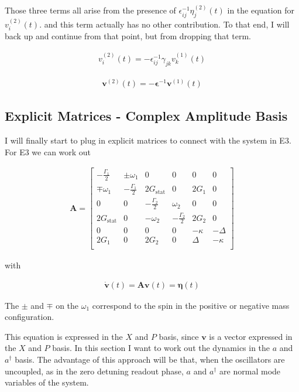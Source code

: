 \documentclass[12pt]{article}
\newcommand{\bv}[1]{\boldsymbol{#1}}
\begin{document}
Those three terms all arise from the presence of $\epsilon^{-1}_{ij}\eta^{(2)}_{j}(t)$ in the equation for $v^{(2)}_{i}(t)$. and this term actually has no other contribution. To that end, I will back up and continue from that point, but from dropping that term.

\begin{align}
v^{(2)}_{i}(t) = -\epsilon^{-1}_{ij}\gamma_{jk}v^{(1)}_{k}(t)
\end{align}

\begin{align}
\bv{v}^{(2)}(t) = -\bv{\epsilon}^{-1}\bv{v}^{(1)}(t)
\end{align}

\subsection{Explicit Matrices - Complex Amplitude Basis}

I will finally start to plug in explicit matrices to connect with the system in E3. For E3 we can work out

\begin{align}
\bv{A} = \begin{bmatrix}
-\frac{\Gamma_1}{2} & \pm \omega_1 & 0 & 0 & 0 & 0 \\
\mp \omega_1 & -\frac{\Gamma_1}{2} & 2G_{\text{stat}} & 0 & 2G_1 & 0 \\
0 & 0 & -\frac{\Gamma_2}{2} & \omega_2 & 0 & 0 \\
2G_{\text{stat}} & 0 & -\omega_2 & -\frac{\Gamma_2}{2} & 2G_2 & 0\\
0 & 0 & 0 & 0 & -\kappa & -\Delta \\
2G_1 & 0 & 2G_2 & 0 & \Delta & -\kappa \\ \end{bmatrix}
\end{align}

with

\begin{align}
\dot{\bv{v}}(t) = \bv{A}\bv{v}(t) = \bv{\eta}(t)
\end{align}

The $\pm$ and $\mp$ on the $\omega_1$ correspond to the spin in the positive or negative mass configuration.

This equation is expressed in the $X$ and $P$ basis, since $\bv{v}$ is a vector expressed in the $X$ and $P$ basis. In this section I want to work out the dynamics in the $a$ and $a^{\dag}$ basis. The advantage of this approach will be that, when the oscillators are uncoupled, as in the zero detuning readout phase, $a$ and $a^{\dag}$ are normal mode variables of the system.
\end{document}
